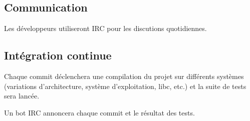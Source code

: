 \subsection{Communication}

Les développeurs utiliseront IRC pour les discutions quotidiennes.

\subsection{Intégration continue}

Chaque commit déclenchera une compilation du projet sur différents systèmes
(variations d'architecture, système d'exploitation, libc, etc.) et la suite de
tests sera lancée.

Un bot IRC annoncera chaque commit et le résultat des tests.
